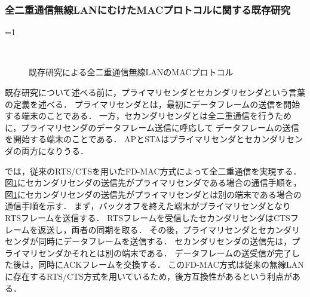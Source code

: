 \documentclass[master]{kuisthesis}		%
\newcounter{flagFig}
\begin{document}
		\subsubsection{全二重通信無線LANにむけたMACプロトコルに関する既存研究}\label{sec:mac_problem}

			\ifnum\value{flagFig}=1 {\begin{figure}[t]
				\begin{center}
						\\
						\caption{既存研究\cite{fdmac}による全二重通信無線LANのMACプロトコル}
						\label{fig:fdmac_protocol}
				\end{center}
			\end{figure}}\fi

			既存研究について述べる前に，プライマリセンダとセカンダリセンダという言葉の定義を述べる．
			プライマリセンダとは，最初にデータフレームの送信を開始する端末のことである．
			一方，セカンダリセンダとは全二重通信を行うために，プライマリセンダのデータフレーム送信に呼応して
			データフレームの送信を開始する端末のことである．
			APとSTAはプライマリセンダとセカンダリセンダの両方になりうる．
			\par
			\cite{fdmac}では，従来のRTS/CTSを用いたFD-MAC方式によって全二重通信を実現する．
			図\ref{fig:fdmac_protocol}にセカンダリセンダの送信先がプライマリセンダである場合の通信手順を，
			図\ref{fig:fdmac_protocol}にセカンダリセンダの送信先がプライマリセンダとは別の端末である場合の通信手順を示す．
			まず，バックオフを終えた端末がプライマリセンダとなりRTSフレームを送信する．
			RTSフレームを受信したセカンダリセンダはCTSフレームを返送し，両者の同期を取る．
			その後，プライマリセンダとセカンダリセンダが同時にデータフレームを送信する．
			セカンダリセンダの送信先は，プライマリセンダかそれとは別の端末である．
			データフレームの送受信が完了した後は，同時にACKフレームを交換する．
			このFD-MAC方式は従来の無線LANに存在するRTS/CTS方式を用いているため，後方互換性があるという利点がある．
\end{document}

